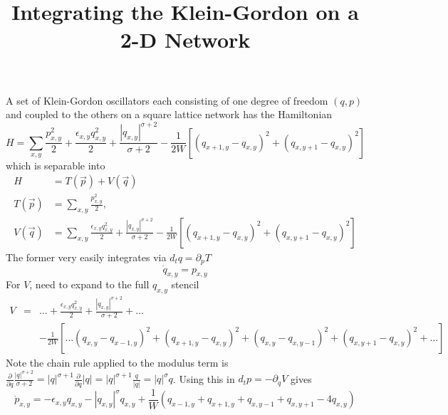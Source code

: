 \documentclass[12pt, a4paper, prl]{revtex4}
\newcommand{\abs}[1]{\left| #1 \right|}
\begin{document}
\title{Integrating the Klein-Gordon on a 2-D Network}
\maketitle

A set of Klein-Gordon oscillators each consisting of one degree of freedom $(q,p)$ and coupled to the others on a square lattice network has
the Hamiltonian
\begin{equation}
 H = \sum_{x,y} \frac{p_{x,y}^2}{2} + \frac{\epsilon_{x,y} q_{x,y}^2}{2} + \frac{\abs{q_{x,y}}^{\sigma + 2}}{\sigma + 2} - \frac{1}{2W}\left[
 \left(q_{x+1,y} - q_{x,y} \right)^2 + \left(q_{x,y+1} - q_{x,y} \right)^2 \right] \label{eq:KGHam}
\end{equation}
which is separable into
\begin{align*}
 H &= T(\vec p) + V(\vec q) \\
T(\vec p) &= \sum_{x,y} \frac{p_{x,y}^2}{2}, \\
V(\vec q) &= \sum_{x,y} \frac{\epsilon_{x,y} q_{x,y}^2}{2} + \frac{\abs{q_{x,y}}^{\sigma + 2}}{\sigma + 2} - \frac{1}{2W}\left[
 \left(q_{x+1,y} - q_{x,y} \right)^2 + \left(q_{x,y+1} - q_{x,y} \right)^2 \right]
\end{align*}
The former very easily integrates via $d_t q = \partial_p T$ 
\begin{equation}
\dot{q}_{x,y} = p_{x,y} \label{eq:EOMq}
\end{equation}
For $V$, need to expand to the full $q_{x,y}$ stencil
\begin{eqnarray*}
V &=& \ldots + \frac{\epsilon_{x,y} q_{x,y}^2}{2} + \frac{\abs{q_{x,y}}^{\sigma + 2}}{\sigma + 2} + \ldots \\
&& - \frac{1}{2W}\left[ \ldots  \left(q_{x,y} - q_{x-1,y} \right)^2  + \left(q_{x+1,y} - q_{x,y} \right)^2 + \left(q_{x,y} - q_{x,y-1} \right)^2  + \left(q_{x,y+1} - q_{x,y} \right)^2 + \ldots \right]
\end{eqnarray*}
Note the chain rule applied to the modulus term is $\frac{\partial}{\partial q}  \frac{\abs{q}^{\sigma + 2}}{\sigma + 2} = 
\abs{q}^{\sigma + 1} \frac{\partial}{\partial q} \abs{q} = \abs{q}^{\sigma + 1} \frac{q}{\abs{q}}
= \abs{q}^\sigma q$. Using this in  $d_t p = -\partial_q V$ gives
\begin{equation}
{\dot p}_{x,y} = - \epsilon_{x,y} q_{x,y} - \abs{q_{x,y}}^\sigma q_{x,y} + \frac{1}{W}\left( q_{x-1,y} + q_{x+1,y} + q_{x,y-1} + q_{x,y+1} - 4q_{x,y} \right) 
 \end{equation}
\end{document}
